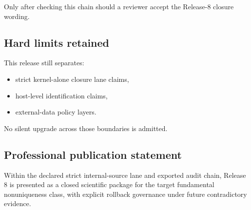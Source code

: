\documentclass[11pt,a4paper]{article}
\begin{document}
Only after checking this chain should a reviewer accept the Release-8 closure wording.

\subsection{Hard limits retained}
This release still separates:
\begin{itemize}
  \item strict kernel-alone closure lane claims,
  \item host-level identification claims,
  \item external-data policy layers.
\end{itemize}
No silent upgrade across those boundaries is admitted.

\subsection{Professional publication statement}
Within the declared strict internal-source lane and exported audit chain,
Release 8 is presented as a closed scientific package for the target fundamental nonuniqueness class,
with explicit rollback governance under future contradictory evidence.
\end{document}
